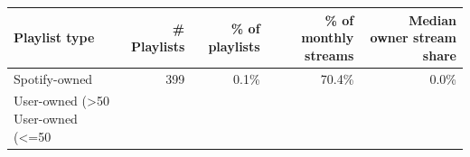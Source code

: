 \begin{tabular}{lrrrr}
\toprule
Playlist type & # Playlists & \% of playlists & \% of monthly streams & Median owner stream share \\
\midrule
Spotify-owned & 399 & 0.1\% & 70.4\% & 0.0\% \\
User-owned (>50%
User-owned (<=50%
\bottomrule
\end{tabular}
